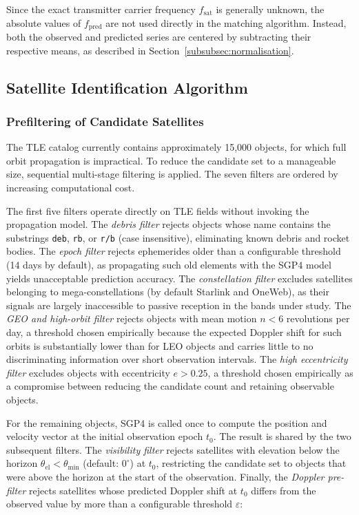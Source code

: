 \documentclass[lineno,pdflatex,sn-basic,referee,]{sn-jnl}
\begin{document}
Since the exact transmitter carrier frequency $f_{\mathrm{sat}}$ is generally unknown, the absolute values of $f_{\mathrm{pred}}$ are not used directly in the matching algorithm. Instead, both the observed and predicted series are centered by subtracting their respective means, as described in Section~\ref{subsubsec:normalisation}.


\subsection{Satellite Identification Algorithm}
\label{subsec:identification-algorithm}

\subsubsection{Prefiltering of Candidate Satellites}
\label{subsubsec:prefiltering}

The TLE catalog currently contains approximately 15,000 objects, for which full orbit propagation is impractical. To reduce the candidate set to a manageable size, sequential multi-stage filtering is applied. The seven filters are ordered by increasing computational cost.

The first five filters operate directly on TLE fields without invoking the propagation model. The \emph{debris filter} rejects objects whose name contains the substrings \texttt{deb}, \texttt{rb}, or \texttt{r/b} (case insensitive), eliminating known debris and rocket bodies. The \emph{epoch filter} rejects ephemerides older than a configurable threshold (14 days by default), as propagating such old elements with the SGP4 model yields unacceptable prediction accuracy. The \emph{constellation filter} excludes satellites belonging to mega-constellations (by default Starlink and OneWeb), as their signals are largely inaccessible to passive reception in the bands under study. The \emph{GEO and high-orbit filter} rejects objects with mean motion $n < 6$ revolutions per day, a threshold chosen empirically because the expected Doppler shift for such orbits is substantially lower than for LEO objects and carries little to no discriminating information over short observation intervals. The \emph{high eccentricity filter} excludes objects with eccentricity $e > 0.25$, a threshold chosen empirically as a compromise between reducing the candidate count and retaining observable objects.

For the remaining objects, SGP4 is called once to compute the position and velocity vector at the initial observation epoch $t_0$. The result is shared by the two subsequent filters. The \emph{visibility filter} rejects satellites with elevation below the horizon $\theta_{\mathrm{el}} < \theta_{\min}$ (default: $0^\circ$) at $t_0$, restricting the candidate set to objects that were above the horizon at the start of the observation. Finally, the \emph{Doppler pre-filter} rejects satellites whose predicted Doppler shift at $t_0$ differs from the observed value by more than a configurable threshold $\varepsilon$:
\end{document}
